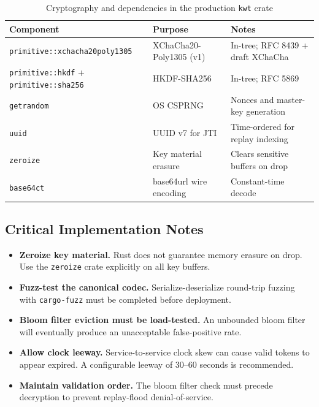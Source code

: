 \documentclass[11pt, letterpaper]{article}
\begin{document}
\begin{table}[H]
\centering
\caption{Cryptography and dependencies in the production \texttt{kwt} crate}
\small
\begin{tabularx}{\linewidth}{L{3.6cm} L{3.4cm} X}
\toprule
{}
\color{white}\textbf{Component} &
\color{white}\textbf{Purpose} &
\color{white}\textbf{Notes} \\
\midrule
\texttt{primitive::xchacha20poly1305} & XChaCha20-Poly1305 (v1) & In-tree; RFC 8439 + draft XChaCha \\
\texttt{primitive::hkdf} + \texttt{primitive::sha256} & HKDF-SHA256 & In-tree; RFC 5869 \\
\texttt{getrandom}        & OS CSPRNG                 & Nonces and master-key generation \\
\texttt{uuid}             & UUID v7 for JTI           & Time-ordered for replay indexing \\
\texttt{zeroize}          & Key material erasure      & Clears sensitive buffers on drop \\
\texttt{base64ct}         & base64url wire encoding   & Constant-time decode \\
\bottomrule
\end{tabularx}
\end{table}

\subsection{Critical Implementation Notes}

\begin{itemize}
  \item \textbf{Zeroize key material.} Rust does not guarantee memory erasure
        on drop. Use the \texttt{zeroize} crate explicitly on all key buffers.
  \item \textbf{Fuzz-test the canonical codec.} Serialize-deserialize round-trip
        fuzzing with \texttt{cargo-fuzz} must be completed before deployment.
  \item \textbf{Bloom filter eviction must be load-tested.} An unbounded bloom
        filter will eventually produce an unacceptable false-positive rate.
  \item \textbf{Allow clock leeway.} Service-to-service clock skew can cause
        valid tokens to appear expired. A configurable leeway of 30--60 seconds
        is recommended.
  \item \textbf{Maintain validation order.} The bloom filter check must precede
        decryption to prevent replay-flood denial-of-service.
\end{itemize}
\end{document}
